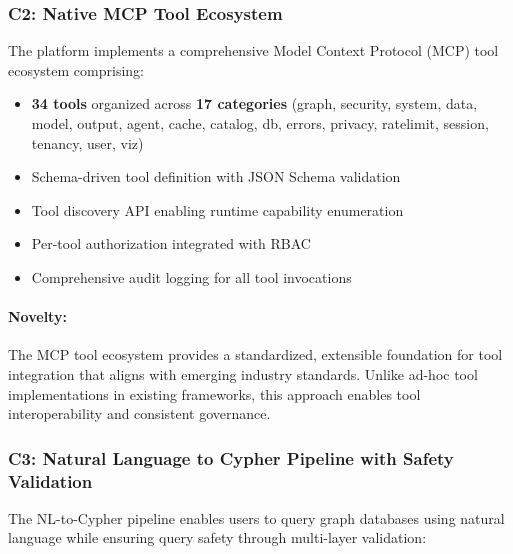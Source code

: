 \subsubsection{C2: Native MCP Tool Ecosystem}

The platform implements a comprehensive Model Context Protocol (MCP) tool ecosystem comprising:

\begin{itemize}
    \item \textbf{34 tools} organized across \textbf{17 categories} (graph, security, system, data, model, output, agent, cache, catalog, db, errors, privacy, ratelimit, session, tenancy, user, viz)
    \item Schema-driven tool definition with JSON Schema validation
    \item Tool discovery API enabling runtime capability enumeration
    \item Per-tool authorization integrated with RBAC
    \item Comprehensive audit logging for all tool invocations
\end{itemize}

\paragraph{Novelty:} The MCP tool ecosystem provides a standardized, extensible foundation for tool integration that aligns with emerging industry standards. Unlike ad-hoc tool implementations in existing frameworks, this approach enables tool interoperability and consistent governance.

\subsubsection{C3: Natural Language to Cypher Pipeline with Safety Validation}

The NL-to-Cypher pipeline enables users to query graph databases using natural language while ensuring query safety through multi-layer validation:

